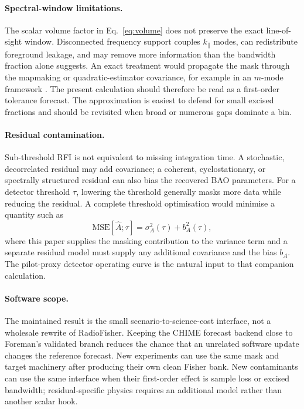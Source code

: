 \paragraph{Spectral-window limitations.}
The scalar volume factor in Eq.~\eqref{eq:volume} does not preserve the
exact line-of-sight window. Disconnected frequency support couples
$k_\parallel$ modes, can redistribute foreground leakage, and may
remove more information than the bandwidth fraction alone suggests. An
exact treatment would propagate the mask through the mapmaking or
quadratic-estimator covariance, for example in an $m$-mode framework
\citep{Shaw2014,Shaw2015}. The present calculation should therefore be
read as a first-order tolerance forecast. The approximation is easiest
to defend for small excised fractions and should be revisited when
broad or numerous gaps dominate a bin.

\paragraph{Residual contamination.}
Sub-threshold RFI is not equivalent to missing integration time. A
stochastic, decorrelated residual may add covariance; a coherent,
cyclostationary, or spectrally structured residual can also bias the
recovered BAO parameters. For a detector threshold $\tau$, lowering
the threshold generally masks more data while reducing the residual. A
complete threshold optimisation would minimise a quantity such as
\begin{equation}
\label{eq:mse}
\mathrm{MSE}[\widehat{A};\tau] = \sigma_A^2(\tau) + b_A^2(\tau),
\end{equation}
where this paper supplies the masking contribution to the variance term
and a separate residual model must supply any additional covariance and
the bias $b_A$. The pilot-proxy detector operating curve is the
natural input to that companion calculation.

\paragraph{Software scope.}
The maintained result is the small scenario-to-science-cost interface,
not a wholesale rewrite of RadioFisher. Keeping the CHIME forecast
backend close to Foreman's validated branch reduces the chance that an
unrelated software update changes the reference forecast. New
experiments can use the same mask and target machinery after producing
their own clean Fisher bank. New contaminants can use the same
interface when their first-order effect is sample loss or excised
bandwidth; residual-specific physics requires an additional model
rather than another scalar hook.

